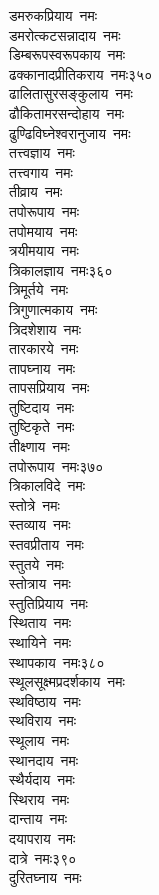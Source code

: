 \begin{multicols}{\maxColumns}
\begin{flushleft}
डमरुकप्रियाय~नमः\\
डमरोत्कटसन्नादाय~नमः\\
डिम्बरूपस्वरूपकाय~नमः\\
ढक्कानादप्रीतिकराय~नमः\hfill ३५०\\
ढालितासुरसङ्कुलाय~नमः\\
ढौकितामरसन्दोहाय~नमः\\
ढुण्ढिविघ्नेश्वरानुजाय~नमः\\
तत्त्वज्ञाय~नमः\\
तत्त्वगाय~नमः\\
तीव्राय~नमः\\
तपोरूपाय~नमः\\
तपोमयाय~नमः\\
त्रयीमयाय~नमः\\
त्रिकालज्ञाय~नमः\hfill ३६०\\
त्रिमूर्तये~नमः\\
त्रिगुणात्मकाय~नमः\\
त्रिदशेशाय~नमः\\
तारकारये~नमः\\
तापघ्नाय~नमः\\
तापसप्रियाय~नमः\\
तुष्टिदाय~नमः\\
तुष्टिकृते~नमः\\
तीक्ष्णाय~नमः\\
तपोरूपाय~नमः\hfill ३७०\\
त्रिकालविदे~नमः\\
स्तोत्रे~नमः\\
स्तव्याय~नमः\\
स्तवप्रीताय~नमः\\
स्तुतये~नमः\\
स्तोत्राय~नमः\\
स्तुतिप्रियाय~नमः\\
स्थिताय~नमः\\
स्थायिने~नमः\\
स्थापकाय~नमः\hfill ३८०\\
स्थूलसूक्ष्मप्रदर्शकाय~नमः\\
स्थविष्ठाय~नमः\\
स्थविराय~नमः\\
स्थूलाय~नमः\\
स्थानदाय~नमः\\
स्थैर्यदाय~नमः\\
स्थिराय~नमः\\
दान्ताय~नमः\\
दयापराय~नमः\\
दात्रे~नमः\hfill ३९०\\
दुरितघ्नाय~नमः\\

\end{flushleft}
\end{multicols}
